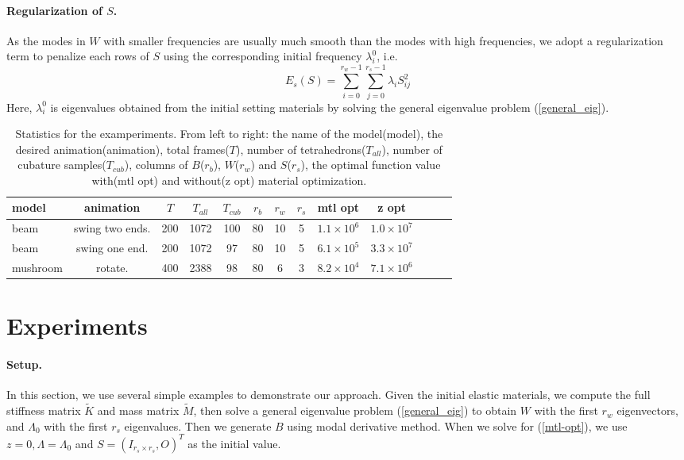 \documentclass[9pt,twocolumn]{extarticle}
\begin{document}
\paragraph{Regularization of $S$. } As the modes in $W$ with smaller frequencies
are usually much smooth than the modes with high frequencies, we adopt a
regularization term to penalize each rows of $S$ using the corresponding initial
frequency $\lambda_i^0$, i.e.
\begin{equation} \label{reg_s}
  E_s(S) = \sum_{i=0}^{r_w-1}\sum_{j=0}^{r_s-1}\lambda_i S^2_{i j}
\end{equation}
Here, $\lambda_i^0$ is eigenvalues obtained from the initial setting materials
by solving the general eigenvalue problem (\ref{general_eig}).

\begin{center}
  \begin{table*}[ht]
    {\small
      \hfill{}
      \begin{tabular}{ | l | c | c | c | c | c | c | c| c | c | c | c | c |}\hline
	    model & animation& $T$ &$T_{all}$ & $T_{cub}$& $r_b$ & $r_w$& $r_s$ &mtl opt& z opt \\ \hline
        beam & swing two ends. &200&  1072 &100 &80 &   10& 5& $1.1\times 10^6$& $1.0\times 10^7$ \\ \hline
        beam & swing one end.  &200&  1072 &97  &80 &  10&  5& $6.1\times 10^5$& $3.3\times 10^7$ \\ \hline        
        mushroom& rotate.      &400&  2388 &98  &80 &   6&  3& $8.2\times 10^4$& $7.1\times 10^6$  \\ \hline
      \end{tabular}
      \hfill{}
}
\caption{ Statistics for the examperiments.  From left to right: the name of the
  model(model), the desired animation(animation), total frames($T$), number of
  tetrahedrons($T_{all}$), number of cubature samples($T_{cub}$), columns of
  $B$($r_b$), $W$($r_w$) and $S$($r_s$), the optimal function value
  with(mtl opt) and without(z opt) material optimization.}
\label{table_1}
\end{table*}
\end{center}

\section{Experiments}\label{sec:experiments}
\paragraph{Setup. }In this section, we use several simple examples to
demonstrate our approach. Given the initial elastic materials, we compute the
full stiffness matrix $\tilde{K}$ and mass matrix $\tilde{M}$, then solve a
general eigenvalue problem (\ref{general_eig}) to obtain $W$ with the first
$r_w$ eigenvectors, and $\Lambda_0$ with the first $r_s$ eigenvalues. Then we
generate $B$ using modal derivative method. 
When we solve for (\ref{mtl-opt}), we use $z=0,\Lambda=\Lambda_0$ and
$S=(I_{r_s\times r_s},O)^T$ as the initial value.
\end{document}
